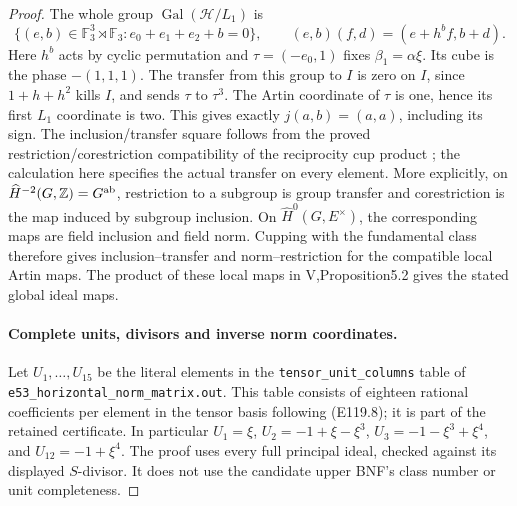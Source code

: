 \begin{proof}
The whole group $\operatorname{Gal}(\mathcal H/L_1)$ is
\[
 \{(e,b)\in\mathbb F_3^3\rtimes\mathbb F_3:
           e_0+e_1+e_2+b=0\},\qquad
 (e,b)(f,d)=(e+h^bf,b+d).
 \tag{E119.14}
\]
Here $h^b$ acts by cyclic permutation and
$\tau=(-e_0,1)$ fixes $\beta_1=\alpha\xi$.
Its cube is the phase $-(1,1,1)$.
The transfer from this group to $I$ is zero on $I$, since
$1+h+h^2$ kills $I$, and sends $\tau$ to $\tau^3$.
The Artin coordinate of $\tau$ is one, hence its first
$L_1$ coordinate is two. This gives exactly
$j(a,b)=(a,a)$, including its sign.
The inclusion/transfer square follows from the proved
restriction/corestriction compatibility of the reciprocity
cup product \cite[III,Theorem3.1 and its proof]{E_MilneCFT};
the calculation here specifies the actual transfer on every element.
More explicitly, on $\widehat H^{-2}(G,\mathbb Z)=G^{\rm ab}$,
restriction to a subgroup is group transfer and corestriction is
the map induced by subgroup inclusion. On
$\widehat H^0(G,E^\times)$, the corresponding maps are field
inclusion and field norm. Cupping with the fundamental class
therefore gives inclusion--transfer and norm--restriction for
the compatible local Artin maps. The product of these local maps
in V,Proposition5.2 gives the stated global ideal maps.

\paragraph{Complete units, divisors and inverse norm coordinates.}
Let $U_1,\ldots,U_{15}$ be the literal elements in the
\texttt{tensor\_unit\_columns} table of
\texttt{e53\_horizontal\_norm\_matrix.out}.
This table consists of eighteen rational coefficients per
element in the tensor basis following (E119.8); it is part
of the retained certificate. In particular
$U_1=\xi$, $U_2=-1+\xi-\xi^3$,
$U_3=-1-\xi^3+\xi^4$, and $U_{12}=-1+\xi^4$.
The proof uses every full principal ideal, checked against its
displayed $S$-divisor. It does not use the candidate upper
BNF's class number or unit completeness.


\end{proof}
